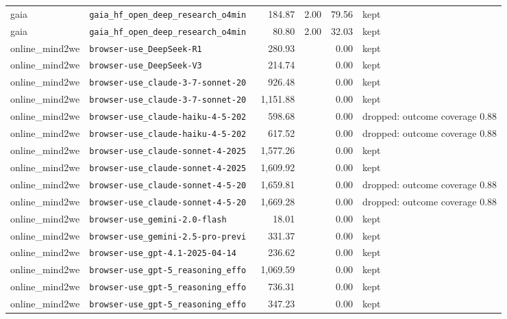 {\begin{longtable}{llrrrl}
gaia & \texttt{\scriptsize gaia\_hf\_open\_deep\_research\_o4min~} & 184.87 & 2.00 & 79.56 & kept \\
gaia & \texttt{\scriptsize gaia\_hf\_open\_deep\_research\_o4min~} & 80.80 & 2.00 & 32.03 & kept \\
online\_mind2we & \texttt{\scriptsize browser-use\_DeepSeek-R1} & 280.93 &  & 0.00 & kept \\
online\_mind2we & \texttt{\scriptsize browser-use\_DeepSeek-V3} & 214.74 &  & 0.00 & kept \\
online\_mind2we & \texttt{\scriptsize browser-use\_claude-3-7-sonnet-20~} & 926.48 &  & 0.00 & kept \\
online\_mind2we & \texttt{\scriptsize browser-use\_claude-3-7-sonnet-20~} & 1,151.88 &  & 0.00 & kept \\
online\_mind2we & \texttt{\scriptsize browser-use\_claude-haiku-4-5-202~} & 598.68 &  & 0.00 & dropped: outcome coverage 0.88 \\
online\_mind2we & \texttt{\scriptsize browser-use\_claude-haiku-4-5-202~} & 617.52 &  & 0.00 & dropped: outcome coverage 0.88 \\
online\_mind2we & \texttt{\scriptsize browser-use\_claude-sonnet-4-2025~} & 1,577.26 &  & 0.00 & kept \\
online\_mind2we & \texttt{\scriptsize browser-use\_claude-sonnet-4-2025~} & 1,609.92 &  & 0.00 & kept \\
online\_mind2we & \texttt{\scriptsize browser-use\_claude-sonnet-4-5-20~} & 1,659.81 &  & 0.00 & dropped: outcome coverage 0.88 \\
online\_mind2we & \texttt{\scriptsize browser-use\_claude-sonnet-4-5-20~} & 1,669.28 &  & 0.00 & dropped: outcome coverage 0.88 \\
online\_mind2we & \texttt{\scriptsize browser-use\_gemini-2.0-flash} & 18.01 &  & 0.00 & kept \\
online\_mind2we & \texttt{\scriptsize browser-use\_gemini-2.5-pro-previ~} & 331.37 &  & 0.00 & kept \\
online\_mind2we & \texttt{\scriptsize browser-use\_gpt-4.1-2025-04-14} & 236.62 &  & 0.00 & kept \\
online\_mind2we & \texttt{\scriptsize browser-use\_gpt-5\_reasoning\_effo~} & 1,069.59 &  & 0.00 & kept \\
online\_mind2we & \texttt{\scriptsize browser-use\_gpt-5\_reasoning\_effo~} & 736.31 &  & 0.00 & kept \\
online\_mind2we & \texttt{\scriptsize browser-use\_gpt-5\_reasoning\_effo~} & 347.23 &  & 0.00 & kept \\

\end{longtable}}
